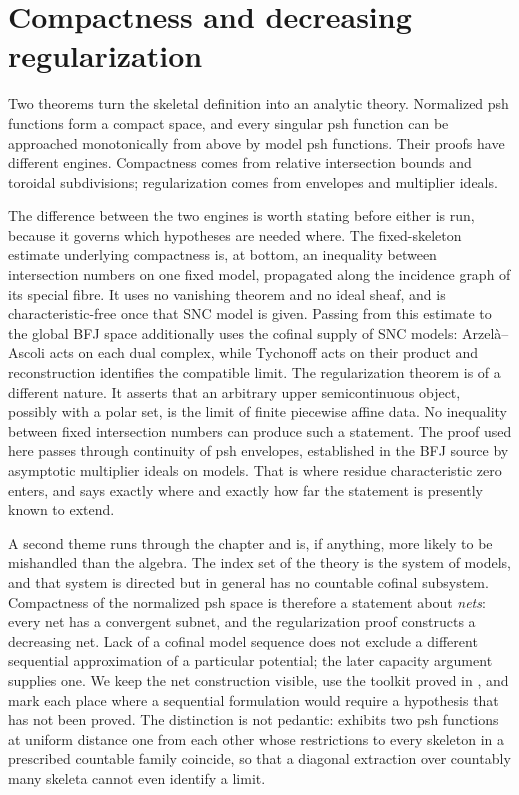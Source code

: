 \chapter{Compactness and decreasing regularization}
\label{chap:bfj-compactness}

Two theorems turn the skeletal definition into an analytic theory.
Normalized psh functions form a compact space, and every singular psh
function can be approached monotonically from above by model psh functions.
Their proofs have different engines.  Compactness comes from relative
intersection bounds and toroidal subdivisions; regularization comes from
envelopes and multiplier ideals.

The difference between the two engines is worth stating before either is
run, because it governs which hypotheses are needed where.  The
fixed-skeleton estimate underlying compactness is, at bottom, an inequality
between intersection numbers on one fixed model, propagated along the
incidence graph of its special fibre.  It uses no vanishing theorem and no
ideal sheaf, and is characteristic-free once that SNC model is given.
Passing from this estimate to the global BFJ space additionally uses the
cofinal supply of SNC models: Arzel\`a--Ascoli acts on each dual complex,
while Tychonoff acts on their product and reconstruction identifies the
compatible limit.  The regularization theorem is of a different nature.
It asserts that an arbitrary upper semicontinuous
object, possibly with a polar set, is the limit of finite piecewise affine
data.  No inequality between fixed intersection numbers can produce such a
statement.  The proof used here passes through continuity of psh envelopes,
established in the BFJ source by asymptotic multiplier ideals on models.
That is where residue
characteristic zero enters, and  says exactly
where and exactly how far the statement is presently known to extend.

A second theme runs through the chapter and is, if anything, more likely to
be mishandled than the algebra.  The index set of the theory is the system
of models, and that system is directed but in general has no countable
cofinal subsystem.  Compactness of the normalized psh space is therefore a
statement about \emph{nets}: every net has a convergent subnet, and the
regularization proof constructs a decreasing net.  Lack of a cofinal model
sequence does not exclude a different sequential approximation of a
particular potential; the later capacity argument supplies one.  We keep
the net construction visible, use the toolkit proved in
, and mark each place where a sequential
formulation would require a hypothesis that has not been proved.  The
distinction is not pedantic:  exhibits two
psh functions at uniform distance one from each other whose restrictions to
every skeleton in a prescribed countable family coincide, so that a diagonal
extraction over countably many skeleta cannot even identify a limit.


